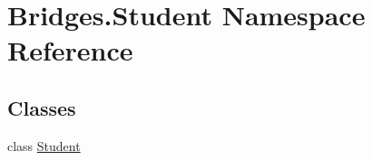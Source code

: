 \hypertarget{namespace_bridges_1_1_student}{}\section{Bridges.\+Student Namespace Reference}
\label{namespace_bridges_1_1_student}
\subsection*{Classes}
\begin{DoxyCompactItemize}
\item 
class \hyperlink{class_bridges_1_1_student_1_1_student}{Student}
\end{DoxyCompactItemize}
